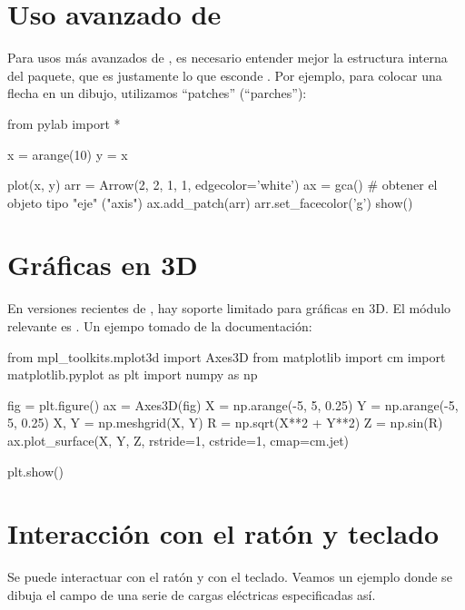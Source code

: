 \section{Uso avanzado de }
Para usos más avanzados de , es necesario entender mejor la estructura interna del paquete, que es justamente lo que esconde .  Por ejemplo, para colocar una flecha en un dibujo, utilizamos ``patches'' (``parches''):
\begin{python}
from pylab import *
   
x = arange(10)
y = x

plot(x, y)
arr = Arrow(2, 2, 1, 1, edgecolor='white')
ax = gca()   # obtener el objeto tipo "eje" ("axis")
ax.add_patch(arr)
arr.set_facecolor('g')
show()
\end{python}


\section{Gráficas en 3D}
En versiones recientes de , hay soporte limitado para gráficas en 3D. 
El módulo relevante es .
Un ejempo tomado de la documentación:
\begin{python}
from mpl_toolkits.mplot3d import Axes3D
from matplotlib import cm
import matplotlib.pyplot as plt
import numpy as np

fig = plt.figure()
ax = Axes3D(fig)
X = np.arange(-5, 5, 0.25)
Y = np.arange(-5, 5, 0.25)
X, Y = np.meshgrid(X, Y)
R = np.sqrt(X**2 + Y**2)
Z = np.sin(R)
ax.plot_surface(X, Y, Z, rstride=1, cstride=1, cmap=cm.jet)

plt.show()
\end{python}

\section{Interacción con el ratón y teclado}
Se puede interactuar con el ratón y con el teclado. Veamos un ejemplo donde se dibuja el campo de una serie de cargas eléctricas especificadas así.





